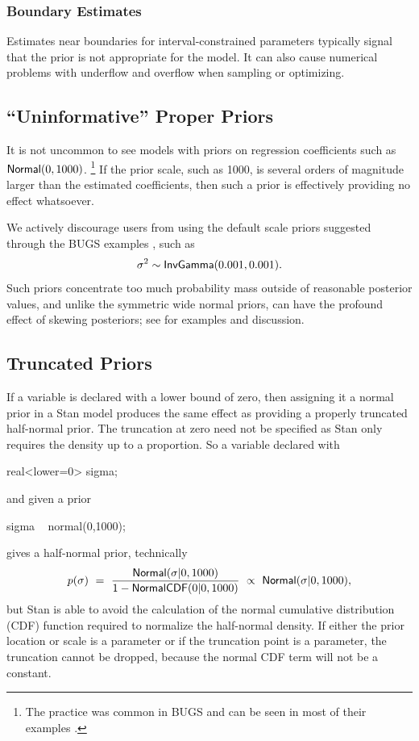 \subsubsection{Boundary Estimates}

Estimates near boundaries for interval-constrained parameters
typically signal that the prior is not appropriate for the model.  It
can also cause numerical problems with underflow and overflow when
sampling or optimizing.

\subsection{``Uninformative'' Proper Priors}

It is not uncommon to see models with priors on regression
coefficients such as $\distro{Normal}(0,1000)$.%
%
\footnote{The practice was common in BUGS and can be seen in most of
  their examples \cite{LunnEtAl:2012}.}
%
If the prior scale, such as 1000, is several orders of magnitude
larger than the estimated coefficients, then such a prior is
effectively providing no effect whatsoever.  

We actively discourage users from using the default scale priors
suggested through the BUGS examples \citep{LunnEtAl:2012}, such as
\[
\sigma^2 \sim \distro{InvGamma}(0.001, 0.001).
\]
%
Such priors concentrate too much probability mass outside of
reasonable posterior values, and unlike the symmetric wide normal
priors, can have the profound effect of skewing posteriors; see
\citep{Gelman:2006} for examples and discussion.

\subsection{Truncated Priors}

If a variable is declared with a lower bound of zero, then assigning
it a normal prior in a Stan model produces the same effect as
providing a properly truncated half-normal prior.  The truncation at
zero need not be specified as Stan only requires the density up to a
proportion.  So a variable declared with
%
\begin{stancode}
real<lower=0> sigma;
\end{stancode}
%
and given a prior
\begin{stancode}
sigma ~ normal(0,1000);
\end{stancode}
%
gives  a half-normal prior, technically
%
\[
p(\sigma) 
\ = \
\frac{\distro{Normal}(\sigma|0,1000)}
     {1 - \distro{NormalCDF}(0|0,1000)}
\ \propto \
\distro{Normal}(\sigma|0,1000),
\]
%
but Stan is able to avoid the calculation of the normal cumulative
distribution (CDF) function required to normalize the half-normal density.
If either the prior location or scale is a parameter or if the
truncation point is a parameter, the truncation cannot be dropped,
because the normal CDF term will not be a constant.


